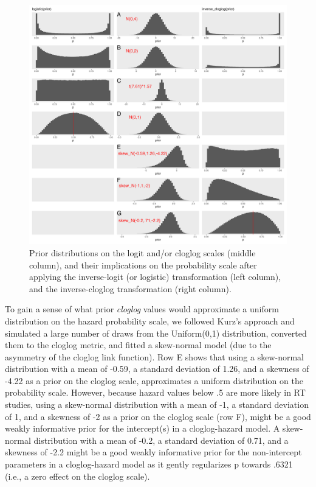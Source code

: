 \documentclass[
  man,floatsintext]{apa6}
\begin{document}
\begin{figure}[H]

{\centering \includegraphics[width=0.8\linewidth,height=0.67\textheight,]{../Tutorial_2_Bayesian/figures/plot_of_priors} 

}

\caption{Prior distributions on the logit and/or cloglog scales (middle column), and their implications on the probability scale after applying the inverse-logit (or logistic) transformation (left column), and the inverse-cloglog transformation (right column).}\label{fig:plot-priors}
\end{figure}

To gain a sense of what prior \emph{cloglog} values would approximate a uniform distribution on the hazard probability scale, we followed Kurz's approach and simulated a large number of draws from the Uniform(0,1) distribution, converted them to the cloglog metric, and fitted a skew-normal model (due to the asymmetry of the cloglog link function). Row E shows that using a skew-normal distribution with a mean of -0.59, a standard deviation of 1.26, and a skewness of -4.22 as a prior on the cloglog scale, approximates a uniform distribution on the probability scale.
However, because hazard values below .5 are more likely in RT studies, using a skew-normal distribution with a mean of -1, a standard deviation of 1, and a skewness of -2 as a prior on the cloglog scale (row F), might be a good weakly informative prior for the intercept(s) in a cloglog-hazard model.
A skew-normal distribution with a mean of -0.2, a standard deviation of 0.71, and a skewness of -2.2 might be a good weakly informative prior for the non-intercept parameters in a cloglog-hazard model as it gently regularizes p towards .6321 (i.e., a zero effect on the cloglog scale).
\end{document}
